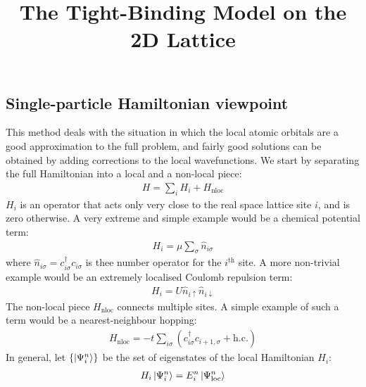 \documentclass[12pt]{article}
\title{The Tight-Binding Model on the 2D Lattice\vspace*{-30pt}}
\author{}
\numberwithin{equation}{section}
\begin{document}
\maketitle
\subsection*{Single-particle Hamiltonian viewpoint}
This method deals with the situation in which the local atomic orbitals are a good approximation to the full problem, and fairly good solutions can be obtained by adding corrections to the local wavefunctions. We start by separating the full Hamiltonian into a local and a non-local piece:
\begin{equation}\begin{aligned}
	H = \sum_i H_i + H_\text{nloc}
\end{aligned}\end{equation}
$H_i$ is an operator that acts only very close to the real space lattice site \(i\), and is zero otherwise. A very extreme and simple example would be a chemical potential term:
\begin{equation}\begin{aligned}
	H_i = \mu \sum_{\sigma} \hat n_{i\sigma}
\end{aligned}\end{equation}
where \(\hat n_{i\sigma} = c^\dagger_{i \sigma}c_{i \sigma}\) is thee number operator for the $i^\text{th}$ site.
A more non-trivial example would be an extremely localised Coulomb repulsion term:
\begin{equation}\begin{aligned}
	H_i =  U\hat n_{i \uparrow}\hat n_{i \downarrow}
\end{aligned}\end{equation}
The non-local piece $H_\text{nloc}$ connects multiple sites. A simple example of such a term would be a nearest-neighbour hopping:
\begin{equation}\begin{aligned}
	H_\text{nloc} =  -t\sum_{i\sigma} \left(c^\dagger_{i\sigma}c_{i+1,\sigma} + \text{h.c.}\right)
\end{aligned}\end{equation}
In general, let $\left\{\ket{\Psi^n_i}\right\}$ be the set of eigenstates of the local Hamiltonian \(H_i\):
\begin{equation}\begin{aligned}
	H_i \ket{\Psi_i^n} = E^n_i\ket{\Psi_\text{loc}^n}
\end{aligned}\end{equation}
\end{document}
